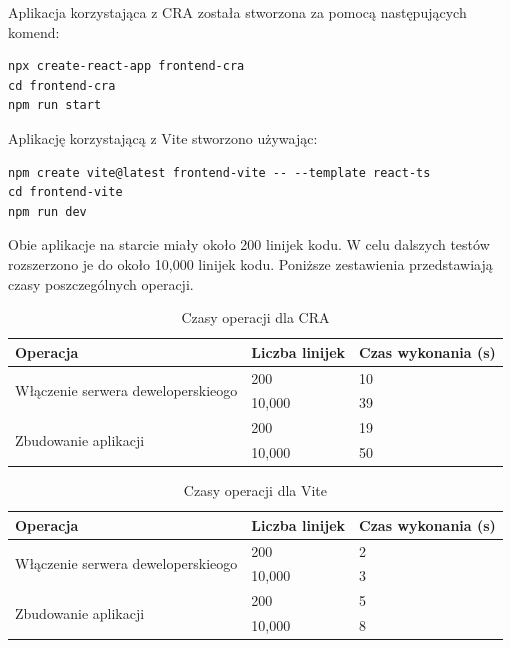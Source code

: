 \documentclass{article}
\begin{document}
Aplikacja korzystająca z CRA została stworzona za pomocą następujących komend:

\begin{lstlisting}[caption=Stworzenie i włączenie aplikacji React (CRA)]
npx create-react-app frontend-cra
cd frontend-cra
npm run start
\end{lstlisting}

Aplikację korzystającą z Vite stworzono używając: 

\begin{lstlisting}[caption=Stworzenie i włączenie aplikacji React (CRA)]
npm create vite@latest frontend-vite -- --template react-ts
cd frontend-vite
npm run dev
\end{lstlisting}

Obie aplikacje na starcie miały około 200 linijek kodu. W celu dalszych testów rozszerzono je do około 10,000 linijek kodu. Poniższe zestawienia przedstawiają czasy poszczególnych operacji.

\begin{table}[H]
\centering
\begin{tabular}{|l|l|l|}
\hline
\textbf{Operacja} & \textbf{Liczba linijek} & \textbf{Czas wykonania (s)} \\ \hline
\multirow{2}{*}{Włączenie serwera deweloperskieogo} & 200 & 10 \\ 
& 10,000 & 39 \\ \hline
\multirow{2}{*}{Zbudowanie aplikacji} & 200 & 19 \\ 
& 10,000 & 50 \\ \hline
\end{tabular}
\caption{Czasy operacji dla CRA}
\label{tab:czas_wykonania}
\end{table}

\begin{table}[H]
\centering
\begin{tabular}{|l|l|l|}
\hline
\textbf{Operacja} & \textbf{Liczba linijek} & \textbf{Czas wykonania (s)} \\ \hline
\multirow{2}{*}{Włączenie serwera deweloperskieogo} & 200 & 2 \\ 
& 10,000 & 3 \\ \hline
\multirow{2}{*}{Zbudowanie aplikacji} & 200 & 5 \\ 
& 10,000 & 8 \\ \hline
\end{tabular}
\caption{Czasy operacji dla Vite}
\label{tab:czas_wykonania}
\end{table}
\end{document}
